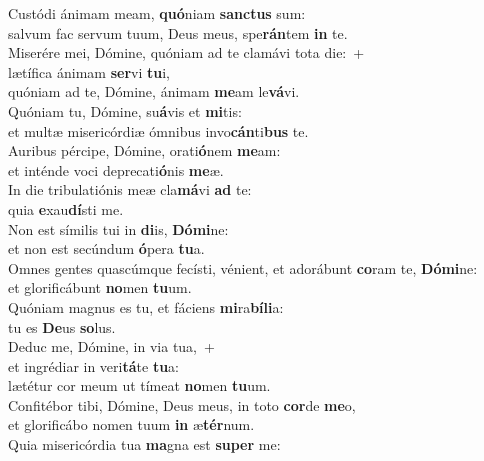 \evenverse Custódi ánimam meam, \textbf{quó}niam \textbf{san}\textbf{ctus} sum:~\*\\
\evenverse salvum fac servum tuum, Deus meus, spe\textbf{rán}tem \textbf{in} te.\\
\oddverse Miserére mei, Dómine, quóniam ad te clamávi tota die:~+\\
\oddverse  lætífica ánimam \textbf{ser}vi \textbf{tu}i,~\*\\
\oddverse quóniam ad te, Dómine, ánimam \textbf{me}am le\textbf{vá}vi.\\
\evenverse Quóniam tu, Dómine, su\textbf{á}vis et \textbf{mi}tis:~\*\\
\evenverse et multæ misericórdiæ ómnibus invo\textbf{cán}ti\textbf{bus} te.\\
\oddverse Auribus pércipe, Dómine, orati\textbf{ó}nem \textbf{me}am:~\*\\
\oddverse et inténde voci deprecati\textbf{ó}nis \textbf{me}æ.\\
\evenverse In die tribulatiónis meæ cla\textbf{má}vi \textbf{ad} te:~\*\\
\evenverse quia \textbf{e}xau\textbf{dí}sti me.\\
\oddverse Non est símilis tui in \textbf{di}is, \textbf{Dó}\textbf{mi}ne:~\*\\
\oddverse et non est secúndum \textbf{ó}pera \textbf{tu}a.\\
\evenverse Omnes gentes quascúmque fecísti, vénient, et adorábunt \textbf{co}ram te, \textbf{Dó}\textbf{mi}ne:~\*\\
\evenverse et glorificábunt \textbf{no}men \textbf{tu}um.\\
\oddverse Quóniam magnus es tu, et fáciens \textbf{mi}ra\textbf{bí}\textbf{li}a:~\*\\
\oddverse tu es \textbf{De}us \textbf{so}lus.\\
\evenverse Deduc me, Dómine, in via tua,~+\\
\evenverse  et ingrédiar in veri\textbf{tá}te \textbf{tu}a:~\*\\
\evenverse lætétur cor meum ut tímeat \textbf{no}men \textbf{tu}um.\\
\oddverse Confitébor tibi, Dómine, Deus meus, in toto \textbf{cor}de \textbf{me}o,~\*\\
\oddverse et glorificábo nomen tuum \textbf{in} æ\textbf{tér}num.\\
\evenverse Quia misericórdia tua \textbf{ma}gna est \textbf{su}\textbf{per} me:~\*\\
